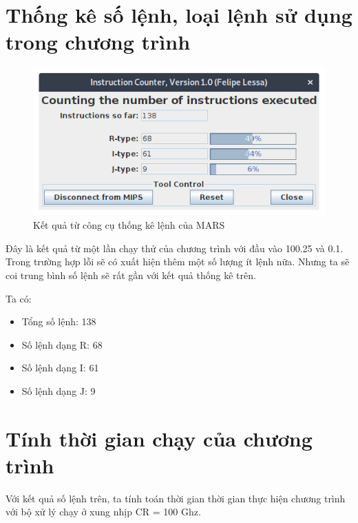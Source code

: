 \hypertarget{thux1ed1ng-kuxea-sux1ed1-lux1ec7nh-loux1ea1i-lux1ec7nh-sux1eed-dux1ee5ng-trong-chux1b0ux1a1ng-truxecnh}{%
\section{Thống kê số lệnh, loại lệnh sử dụng trong chương
trình}\label{thux1ed1ng-kuxea-sux1ed1-lux1ec7nh-loux1ea1i-lux1ec7nh-sux1eed-dux1ee5ng-trong-chux1b0ux1a1ng-truxecnh}}

\begin{figure}
\centering
\includegraphics{img/instr_count.png}
\caption{Kết quả từ công cụ thống kê lệnh của MARS}
\end{figure}

Đây là kết quả từ một lần chạy thử của chương trình với đầu vào 100.25
và 0.1. Trong trường hợp lỗi sẽ có xuất hiện thêm một số lượng ít lệnh
nữa. Nhưng ta sẽ coi trung bình số lệnh sẽ rất gần với kết quả thống kê
trên.

Ta có:

\begin{itemize}
\item
  Tổng số lệnh: 138
\item
  Số lệnh dạng R: 68
\item
  Số lệnh dạng I: 61
\item
  Số lệnh dạng J: 9
\end{itemize}

\hypertarget{tuxednh-thux1eddi-gian-chux1ea1y-cux1ee7a-chux1b0ux1a1ng-truxecnh}{%
\section{Tính thời gian chạy của chương
trình}\label{tuxednh-thux1eddi-gian-chux1ea1y-cux1ee7a-chux1b0ux1a1ng-truxecnh}}

Với kết quả số lệnh trên, ta tính toán thời gian thời gian thực hiện
chương trình với bộ xử lý chạy ở xung nhịp CR = 100 Ghz.

